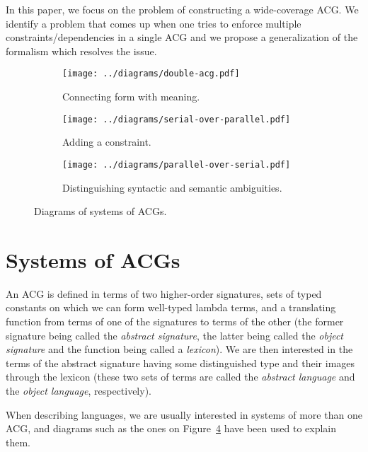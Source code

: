 \documentclass{llncs}
\begin{document}
In this paper, we focus on the problem of constructing a wide-coverage ACG. We
identify a problem that comes up when one tries to enforce multiple
constraints/dependencies in a single ACG and we propose a generalization of
the formalism which resolves the issue.


\begin{figure}[t]
  \centering
  \begin{subfigure}[b]{0.25\textwidth}
    \centering
    \texttt{[image: ../diagrams/double-acg.pdf]}
    \caption{\label{fig:acg-comp-basic} Connecting form with meaning.}
  \end{subfigure}
  \qquad
  \begin{subfigure}[b]{0.25\textwidth}
    \centering
    \texttt{[image: ../diagrams/serial-over-parallel.pdf]}
    \caption{\label{fig:acg-comp-constr} Adding a constraint.}
  \end{subfigure}
  \qquad
  \begin{subfigure}[b]{0.25\textwidth}
    \centering
    \texttt{[image: ../diagrams/parallel-over-serial.pdf]}
    \caption{\label{fig:acg-comp-sem} Distinguishing syntactic and
      semantic ambiguities.}
  \end{subfigure}
  \caption{\label{fig:acg-comp} Diagrams of systems of ACGs.}
\end{figure}


\section{Systems of ACGs}
\label{sec:acg-comp}

An ACG is defined in terms of two higher-order signatures, sets of typed
constants on which we can form well-typed lambda terms, and a
translating function from terms of one of the signatures to terms of the
other (the former signature being called the \emph{abstract signature},
the latter being called the \emph{object signature} and the function
being called a \emph{lexicon}). We are then interested in the terms of
the abstract signature having some distinguished type and their images
through the lexicon (these two sets of terms are called the
\emph{abstract language} and the \emph{object language}, respectively).

When describing languages, we are usually interested in systems of more than
one ACG, and diagrams such as the ones on Figure~\ref{fig:acg-comp} have been
used to explain them.
\end{document}
